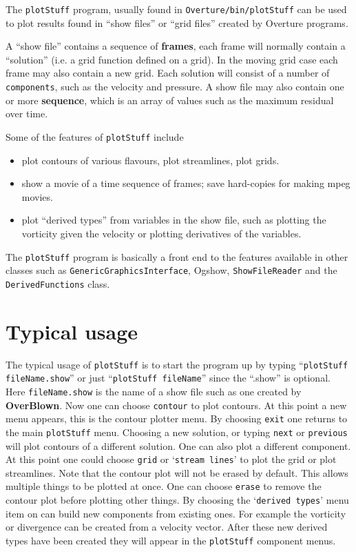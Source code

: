 \documentclass{article}
\begin{document}
The {\tt plotStuff} program, usually found in {\tt Overture/bin/plotStuff} can be used to
plot results found in ``show files'' or ``grid files'' created by Overture programs.

A ``show file'' contains a sequence of {\bf frames}, each frame will normally contain a
``solution'' (i.e. a grid function defined on a grid). In the moving grid case
each frame may also contain a new grid. Each solution will consist of a number
of {\tt components}, such as the velocity and pressure. A show file may also
contain one or more {\bf sequence}, which is an array of values such as the maximum residual
over time.

Some of the features of {\tt plotStuff} include
\begin{itemize}
  \item plot contours of various flavours, plot streamlines, plot grids.
  \item show a movie of a time sequence of frames; save hard-copies for making mpeg movies.
  \item plot ``derived types'' from variables in the show file, 
      such as plotting the vorticity given the velocity or plotting derivatives of
      the variables.
\end{itemize}

The {\tt plotStuff} program is basically a front end to the features available in other classes
such as {\tt GenericGraphicsInterface}\cite{PLOTSTUFF}, Ogshow\cite{OGSHOW}, {\tt ShowFileReader}\cite{OGSHOW}
and the {\tt DerivedFunctions} class.  

\section{Typical usage}

The typical usage of {\tt plotStuff} is to start the program up by typing
``{\tt plotStuff fileName.show}'' or just ``{\tt plotStuff fileName}'' since the ``.show'' is optional.
Here {\tt fileName.show} is the name of a show file such as one created by {\bf OverBlown}\cite{OverBlownUserGuide}.
Now one can choose {\tt contour} to plot contours. At this point a new menu appears, this is
the contour plotter menu. By choosing {\tt exit} one returns to the main {\tt plotStuff}
menu. Choosing a new solution, or typing {\tt next} or {\tt previous} will plot contours
of a different solution. One can also plot a different component. At this point one could
choose {\tt grid} or `{\tt stream lines}' to plot the grid or plot streamlines. Note that
the contour plot will not be erased by default. This allows multiple things to be plotted
at once. One can choose {\tt erase} to remove the contour plot before plotting other things.
By choosing the `{\tt derived types}' menu item on can build new components
from existing ones. For example the vorticity or divergence can be created from a velocity vector.
After these new derived types have been created they will appear in the {\tt plotStuff} component
menus. 
\end{document}
